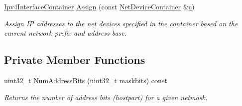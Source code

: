 \begin{DoxyCompactItemize}
\hyperlink{classns3_1_1Ipv4InterfaceContainer}{Ipv4\+Interface\+Container} \hyperlink{classns3_1_1Ipv4AddressHelper_af8e7f4a1a7e74c00014a1eac445a27af}{Assign} (const \hyperlink{classns3_1_1NetDeviceContainer}{Net\+Device\+Container} \&\hyperlink{mmwave_2model_2fading-traces_2fading__trace__generator_8m_ae0323a9039add2978bf5b49550572c7c}{c})
\begin{DoxyCompactList}\small\item\em Assign IP addresses to the net devices specified in the container based on the current network prefix and address base. \end{DoxyCompactList}\end{DoxyCompactItemize}
\subsection*{Private Member Functions}
\begin{DoxyCompactItemize}
\item 
uint32\+\_\+t \hyperlink{classns3_1_1Ipv4AddressHelper_a6da9d5543922d9b6c9bfe38934d5dfc4}{Num\+Address\+Bits} (uint32\+\_\+t maskbits) const 
\begin{DoxyCompactList}\small\item\em Returns the number of address bits (hostpart) for a given netmask. \end{DoxyCompactList}\end{DoxyCompactItemize}
